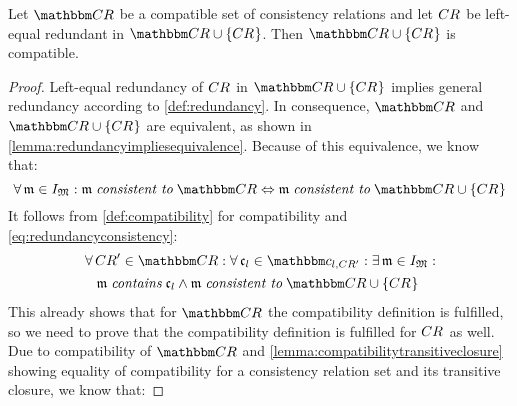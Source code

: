 \begin{theorem} \label{theorem:redundancycompatibility}
    Let $\consistencyrelationset{CR}$ be a compatible set of consistency relations and let $\consistencyrelation{CR}{}$ be left-equal redundant in $\consistencyrelationset{CR} \cup \setted{\consistencyrelation{CR}{}}$. Then $\consistencyrelationset{CR} \cup \setted{\consistencyrelation{CR}{}}$ is compatible. 
\end{theorem}

\begin{proof}
    Left-equal redundancy of $\consistencyrelation{CR}{}$ in $\consistencyrelationset{CR} \cup \setted{\consistencyrelation{CR}{}}$ implies general redundancy according to \autoref{def:redundancy}. In consequence, $\consistencyrelationset{CR}$ and $\consistencyrelationset{CR} \cup \setted{\consistencyrelation{CR}{}}$ are equivalent, as shown in \autoref{lemma:redundancyimpliesequivalence}.
    Because of this equivalence, we know that:
    \begin{equation} \label{eq:redundancyconsistency}
        \forall \modeltuple{m} \in \metamodeltupleinstanceset{M}: \modeltuple{m} \consistenttomath \consistencyrelationset{CR} \equivalent     \modeltuple{m} \consistenttomath \consistencyrelationset{CR} \cup \setted{\consistencyrelation{CR}{}}
    \end{equation}
    It follows from \autoref{def:compatibility} for compatibility and \autoref{eq:redundancyconsistency}:
    \begin{align} \label{eq:redundancycompatibleexisting}
        & \nonumber
        \forall \consistencyrelation{CR}{}' \in \consistencyrelationset{CR} : \forall \conditionelement{c}{l} \in \condition{c}{l, \consistencyrelation{CR}{}'}
        : \exists \modeltuple{m} \in \metamodeltupleinstanceset{M} : \\
        & \formulaskip
        \modeltuple{m} \containsmath \conditionelement{c}{l} \land \modeltuple{m} \consistenttomath \consistencyrelationset{CR} \cup \setted{\consistencyrelation{CR}{}}
    \end{align}
    This already shows that for $\consistencyrelationset{CR}$ the compatibility definition is fulfilled, so we need to prove that the compatibility definition is fulfilled for $\consistencyrelation{CR}{}$ as well.
    Due to compatibility of $\consistencyrelationset{CR}$ and \autoref{lemma:compatibilitytransitiveclosure} showing equality of compatibility for a consistency relation set and its transitive closure, we know that:

\end{proof}
